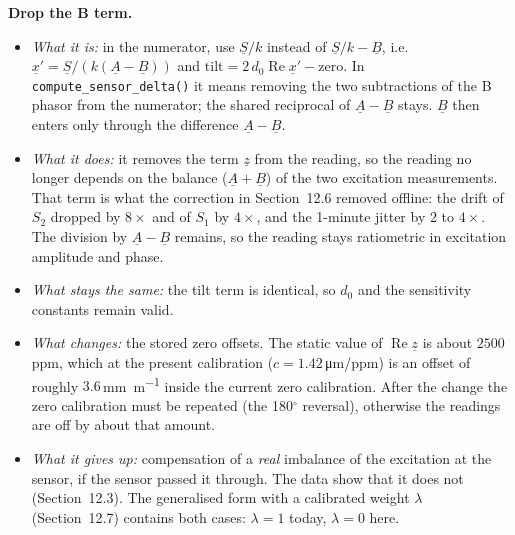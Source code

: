 \documentclass[11pt,a4paper]{article}
\begin{document}
\textbf{Drop the B term.}
\begin{itemize}
  \item \emph{What it is:} in the numerator, use $\underline{S}/k$ instead of
        $\underline{S}/k-\underline{B}$, i.e.\ $\underline{x}'=\underline{S}/(k(\underline{A}-\underline{B}))$
        and $\text{tilt}=2\,d_0\operatorname{Re}\underline{x}'-\text{zero}$.  In
        \texttt{compute\_sensor\_delta()} it means removing the two subtractions
        of the B phasor from the numerator; the shared reciprocal of
        $\underline{A}-\underline{B}$ stays.  $\underline{B}$ then enters only through
        the difference $\underline{A}-\underline{B}$.
  \item \emph{What it does:} it removes the term $\underline{z}$ from the reading, so the
        reading no longer depends on the balance ($\underline{A}+\underline{B}$) of
        the two excitation measurements.  That term is what the correction in
        Section~12.6 removed offline: the drift of $S_2$ dropped by $8\times$ and of
        $S_1$ by $4\times$, and the 1-minute jitter by $2$ to $4\times$.  The division
        by $\underline{A}-\underline{B}$ remains, so the reading stays ratiometric in
        excitation amplitude and phase.
  \item \emph{What stays the same:} the tilt term is identical, so $d_0$ and the
        sensitivity constants remain valid.
  \item \emph{What changes:} the stored zero offsets.  The static value of
        $\operatorname{Re}\underline{z}$ is about $2500$\,ppm, which at the present
        calibration ($c=1.42$\,\si{\micro\metre}/ppm) is an offset of roughly
        $3.6$\,\si{\milli\metre\per\metre} inside the current zero calibration.  After
        the change the zero calibration must be repeated (the 180$^\circ$
        reversal), otherwise the readings are off by about that amount.
  \item \emph{What it gives up:} compensation of a \emph{real} imbalance of the
        excitation at the sensor, if the sensor passed it through.  The data show that it
        does not (Section~12.3).  The generalised form with a calibrated weight $\lambda$
        (Section~12.7) contains both cases: $\lambda=1$ today, $\lambda=0$ here.
\end{itemize}
\end{document}
